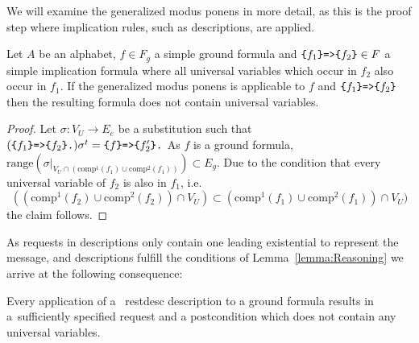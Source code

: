 We will examine the generalized modus ponens in more detail,
as this is the proof step where implication rules, 
such as \restdesc descriptions, are applied.

\label{sec:Reasoning}
\begin{lemma}\label{lemma:Reasoning}
Let $A$ be an \nthree alphabet, %
$f\in F_g$ a simple ground formula and $\verb!{!f_1\verb!}=>{!f_2\verb!}!\in F$ a simple implication formula %
where all 
universal variables which occur in $f_2$ %
also occur in $f_1$. If the generalized modus ponens is applicable to $f$ and $\verb!{!f_1\verb!}=>{!f_2\verb!}!$ then
the resulting formula does not contain universal variables.
\end{lemma}

\begin{proof}
 Let $\sigma:V_U\rightarrow E_e$ be a substitution %
 such that  $(\verb!{!f_1\verb!}=>{!f_2\verb!}.!)\sigma^t= \verb!{!f\verb!}=>{!f_2'\verb!}.!$ 
As $f$ is a ground formula, $\text{range}(\sigma|_{V_U\cap(\text{comp}^1(f_1)\cup \text{comp}^2(f_1))}) \subset E_g$. 
Due to the condition that every universal variable of $f_2$ 
is also in $f_1$, i.e. 
\[((\text{comp}^1(f_2)\cup \text{comp}^2(f_2))\cap V_U )\subset (\text{comp}^1(f_1)\cup \text{comp}^2(f_1))\cap V_U)\]
the claim follows. 
%
\end{proof}


As \http requests in \restdesc descriptions only contain
one leading existential to represent the \http message, and 
\restdesc descriptions 
fulfill the conditions of Lemma~\ref{lemma:Reasoning}
we arrive at the following consequence:

\begin{corollary}
\label{corollary}
Every application of a ~restdesc description to a ground formula results in a~sufficiently specified \http request 
and a postcondition which does not contain any universal variables.
\end{corollary}

